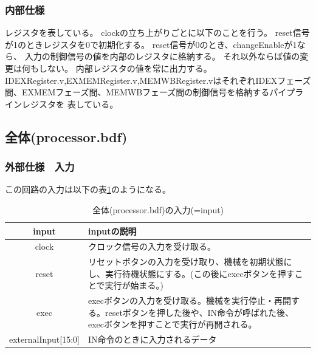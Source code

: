 \documentclass[a4j,titlepage]{jarticle}
\begin{document}
\subsubsection{内部仕様}
レジスタを表している。
clockの立ち上がりごとに以下のことを行う。
reset信号が1のときレジスタを0で初期化する。
reset信号が0のとき、changeEnableが1なら、
入力の制御信号の値を内部のレジスタに格納する。
それ以外ならば値の変更は何もしない。
内部レジスタの値を常に出力する。
IDEXRegister.v,EXMEMRegister.v,MEMWBRegister.vはそれぞれIDEXフェーズ間、EXMEMフェーズ間、MEMWBフェーズ間の制御信号を格納するパイプラインレジスタを
表している。



\newpage
\subsection{全体(processor.bdf)}

\subsubsection{外部仕様　入力}
この回路の入力は以下の表\ref{zentaiprocessorI}のようになる。
\begin{table}[H]
    \caption{全体(processor.bdf)の入力(=input)}
    \label{zentaiprocessorI}
    \begin{center}
    \begin {tabularx}{150mm}{|c|X|} \hline
         input & inputの説明 \\ \hline \hline
         clock & クロック信号の入力を受け取る。 \\ \hline
         reset & リセットボタンの入力を受け取り、機械を初期状態にし、実行待機状態にする。(この後にexecボタンを押すことで実行が始まる。)\\ \hline %
         exec & execボタンの入力を受け取る。機械を実行停止・再開する。resetボタンを押した後や、IN命令が呼ばれた後、execボタンを押すことで実行が再開される。\\ \hline
         externalInput[15:0] & IN命令のときに入力されるデータ\\ \hline
    \end{tabularx}
    \end{center}
\end{table}
\end{document}
